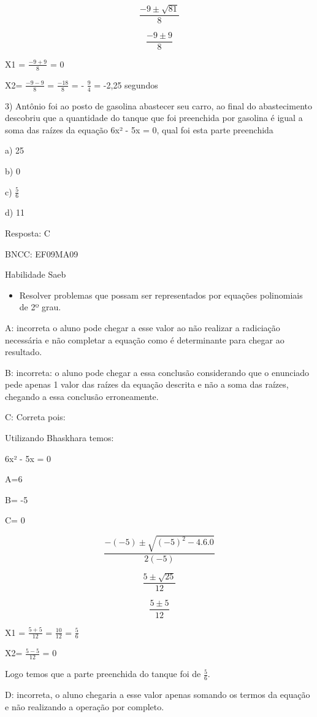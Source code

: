 \[\frac{- 9 \pm \sqrt{81}}{8}\]

\[\frac{- 9 \pm 9}{8}\]

X1 = \(\frac{- 9 + 9}{8}\) = 0

X2= \(\frac{- 9 - 9}{8}\) = \(\frac{- 18}{8}\) = - \(\frac{9}{4}\) =
-2,25 segundos

3) Antônio foi ao posto de gasolina abastecer seu carro, ao final do
abastecimento descobriu que a quantidade do tanque que foi preenchida
por gasolina é igual a soma das raízes da equação 6x² - 5x = 0, qual foi
esta parte preenchida

a) 25

b) 0

c) \(\frac{5}{6}\)

d) 11

Resposta: C

BNCC: EF09MA09

Habilidade Saeb

\begin{itemize}
\tightlist
\item
  Resolver problemas que possam ser representados por equações
  polinomiais de 2º grau.
\end{itemize}

A: incorreta o aluno pode chegar a esse valor ao não realizar a
radiciação necessária e não completar a equação como é determinante para
chegar ao resultado.

B: incorreta: o aluno pode chegar a essa conclusão considerando que o
enunciado pede apenas 1 valor das raízes da equação descrita e não a
soma das raízes, chegando a essa conclusão erroneamente.

C: Correta pois:

Utilizando Bhaskhara temos:

6x² - 5x = 0

A=6

B= -5

C= 0

\[\frac{- ( - 5) \pm \sqrt{{( - 5)}^{2} - 4.6.0}}{2( - 5)}\]

\[\frac{5 \pm \sqrt{25}}{12}\]

\[\frac{5 \pm 5}{12}\]

X1 = \(\frac{5 + 5}{12}\) = \(\frac{10}{12}\) = \(\frac{5}{6}\)

X2= \(\frac{5 - 5}{12}\) = 0

Logo temos que a parte preenchida do tanque foi de \(\frac{5}{6}\).

D: incorreta, o aluno chegaria a esse valor apenas somando os termos da
equação e não realizando a operação por completo.

